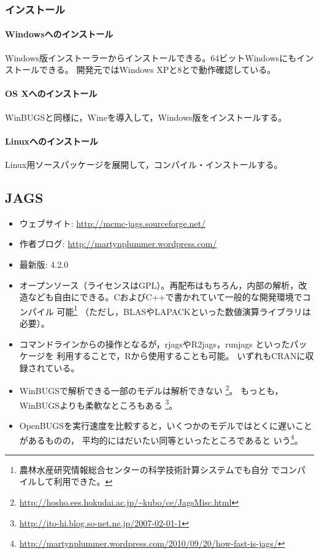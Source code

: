 \documentclass[11pt,uplatex]{jsarticle}
\begin{document}
\subsubsection*{インストール}
\paragraph{Windowsへのインストール}
Windows版インストーラーからインストールできる。64ビットWindowsにもインストールできる。
開発元ではWindows XPと8とで動作確認している。

\paragraph{OS Xへのインストール}
\textsf{WinBUGS}と同様に，\textsf{Wine}を導入して，Windows版をインストールする。

\paragraph{Linuxへのインストール}
Linux用ソースパッケージを展開して，コンパイル・インストールする。

\subsection{JAGS}

\begin{itemize}

\item ウェブサイト:
  \url{http://mcmc-jags.sourceforge.net/}
  
\item 作者ブログ:
  \url{http://martynplummer.wordpress.com/}  

\item 最新版: 4.2.0

\item オープンソース（ライセンスはGPL）。再配布はもちろん，内部の解析，改
  造なども自由にできる。CおよびC++で書かれていて一般的な開発環境でコンパイル
  可能\footnote{農林水産研究情報総合センターの科学技術計算システムでも自分
  でコンパイルして利用できた。}
  （ただし，BLASやLAPACKといった数値演算ライブラリは必要）。

\item コマンドラインからの操作となるが，\textsf{rjags}や\textsf{R2jags}，\textsf{runjags}
といったパッケージを
利用することで，\textsf{R}から使用することも可能。
いずれもCRANに収録されている。

\item \textsf{WinBUGS}で解析できる一部のモデルは解析できない
  \footnote{\url{http://hosho.ees.hokudai.ac.jp/~kubo/ce/JagsMisc.html}}。
 もっとも，\textsf{WinBUGS}よりも柔軟なところもある
  \footnote{\url{http://ito-hi.blog.so-net.ne.jp/2007-02-01-1}}。
  
\item \textsf{OpenBUGS}を実行速度を比較すると，いくつかのモデルではとくに遅いことがあるものの，
平均的にはだいたい同等といったところであると
いう\footnote{\url{http://martynplummer.wordpress.com/2010/09/20/how-fast-is-jags/}}。

\end{itemize}
\end{document}
